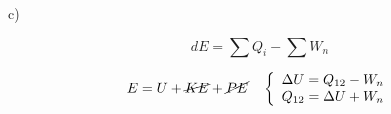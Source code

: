 c) \quad {}

\[
dE = \sum Q_{i} - \sum W_{n}
\]

\[
E = U + \cancel{KE} + \cancel{PE} \quad \left\{ \begin{array}{l}
\Delta U = Q_{12} - W_{n} \\
Q_{12} = \Delta U + W_{n}
\end{array} \right.
\]